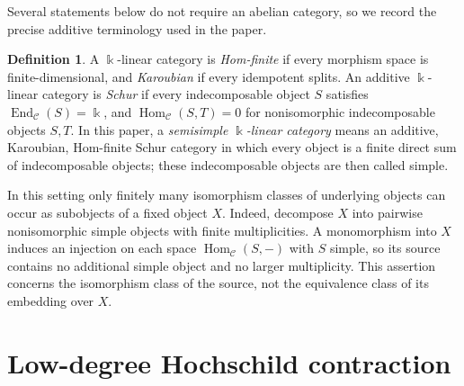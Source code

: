 \documentclass[11pt]{amsart}
\theoremstyle{definition}
\newtheorem{definition}[theorem]{Definition}
\theoremstyle{remark}
\newcommand{\C}{\mathcal C}
\newcommand{\kk}{\Bbbk}
\DeclareMathOperator{\Hom}{Hom}
\DeclareMathOperator{\End}{End}
\begin{document}
Several statements below do not require an abelian category, so we record
the precise additive terminology used in the paper.

\begin{definition}\label{def:semisimple-linear-category}
A $\kk$-linear category is \emph{Hom-finite} if every morphism space is
finite-dimensional, and \emph{Karoubian} if every idempotent splits.  An
additive $\kk$-linear category is \emph{Schur} if every indecomposable object
$S$ satisfies $\End_{\C}(S)=\kk$, and
$\Hom_{\C}(S,T)=0$ for nonisomorphic indecomposable objects $S,T$.  In this
paper, a \emph{semisimple $\kk$-linear category} means an additive,
Karoubian, Hom-finite Schur category in which every object is a finite direct
sum of indecomposable objects; these indecomposable objects are then called
simple.
\end{definition}

In this setting only finitely many isomorphism classes of underlying objects
can occur as subobjects of a fixed object $X$.  Indeed, decompose $X$ into
pairwise nonisomorphic simple objects with finite multiplicities.  A
monomorphism into $X$ induces an injection on each space
$\Hom_{\C}(S,-)$ with $S$ simple, so its source contains no additional
simple object and no larger multiplicity.  This assertion concerns the
isomorphism class of the source, not the equivalence class of its embedding
over $X$.

\section{Low-degree Hochschild contraction}\label{sec:hoch}
\end{document}
